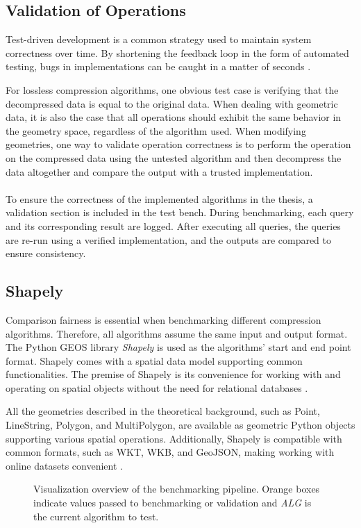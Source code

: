\subsection{Validation of Operations}
Test-driven development is a common strategy used to maintain system correctness over time. By shortening the feedback loop in the form of automated testing, bugs in implementations can be caught in a matter of seconds \cite{tdd}.

For lossless compression algorithms, one obvious test case is verifying that the decompressed data is equal to the original data. When dealing with geometric data, it is also the case that all operations should exhibit the same behavior in the geometry space, regardless of the algorithm used. When modifying geometries, one way to validate operation correctness is to perform the operation on the compressed data using the untested algorithm and then decompress the data altogether and compare the output with a trusted implementation.
\\\\
To ensure the correctness of the implemented algorithms in the thesis, a validation section is included in the test bench. During benchmarking, each query and its corresponding result are logged. After executing all queries, the queries are re-run using a verified implementation, and the outputs are compared to ensure consistency.

\subsection{Shapely}
Comparison fairness is essential when benchmarking different compression algorithms. Therefore, all algorithms assume the same input and output format. The Python GEOS library \emph{Shapely} is used as the algorithms' start and end point format. Shapely comes with a spatial data model supporting common functionalities. The premise of Shapely is its convenience for working with and operating on spatial objects without the need for relational databases \cite{shapely}.

All the geometries described in the theoretical background, such as Point, LineString, Polygon, and MultiPolygon, are available as geometric Python objects supporting various spatial operations. Additionally, Shapely is compatible with common formats, such as WKT, WKB, and GeoJSON, making working with online datasets convenient \cite{shapely}.

\begin{figure}[htbp]
    \centering
    
    \caption{Visualization overview of the benchmarking pipeline. Orange boxes indicate values passed to benchmarking or validation and \textit{ALG} is the current  algorithm to test.}
    \label{img:bench}
\end{figure}

